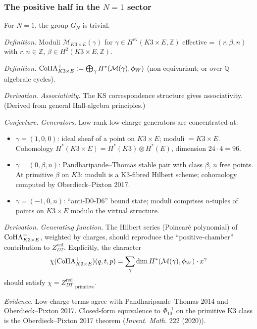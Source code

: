 \subsubsection{The positive half in the $N=1$ sector}

For $N=1$, the group $G_N$ is trivial.

\emph{Definition.} Moduli $\mathcal{M}_{K3 \times E}(\gamma)$ for $\gamma \in H^{\mathrm{ev}}(K3 \times E, \mathbb{Z})$
effective = $(r, \beta, n)$ with $r, n \in \mathbb{Z}$, $\beta \in H^2(K3 \times E, \mathbb{Z})$.

\emph{Definition.} $\mathrm{CoHA}^+_{K3 \times E} := \bigoplus_\gamma H^*(\mathcal{M}(\gamma), \phi_W)$
(non-equivariant; or over $\mathbb{Q}$-algebraic cycles).

\emph{Derivation.} \emph{Associativity.} The KS correspondence structure gives
associativity. (Derived from general Hall-algebra principles.)

\emph{Conjecture.} \emph{Generators.}
Low-rank low-charge generators are concentrated at:
\begin{itemize}
\item $\gamma = (1, 0, 0)$: ideal sheaf of a point on $K3 \times E$; moduli $= K3 \times E$.
Cohomology $H^*(K3 \times E) = H^*(K3) \otimes H^*(E)$, dimension $24 \cdot 4 = 96$.
\item $\gamma = (0, \beta, n)$: Pandharipande--Thomas stable pair with class $\beta$,
$n$ free points. At primitive $\beta$ on $K3$: moduli is a K3-fibred Hilbert scheme;
cohomology computed by Oberdieck--Pixton 2017.
\item $\gamma = (-1, 0, n)$: ``anti-D0-D6'' bound state; moduli comprises $n$-tuples of
points on $K3 \times E$ modulo the virtual structure.
\end{itemize}

\emph{Derivation.} \emph{Generating function.} The Hilbert series (Poincaré polynomial)
of $\mathrm{CoHA}^+_{K3 \times E}$, weighted by charges, should reproduce the ``positive-chamber''
contribution to $Z^{\mathrm{red}}_{DT}$. Explicitly, the character
\[
\chi(\mathrm{CoHA}^+_{K3 \times E})(q, t, p) = \sum_\gamma \dim H^*(\mathcal{M}(\gamma), \phi_W) \cdot x^\gamma
\]
should satisfy $\chi = Z^{\mathrm{red}}_{DT}|_{\mathrm{primitive}}$.

\emph{Evidence.} Low-charge terms agree with Pandharipande--Thomas 2014
and Oberdieck--Pixton 2017. Closed-form equivalence to
$\Phi_{10}^{-1}$ on the primitive K3 class is the Oberdieck--Pixton
2017 theorem (\emph{Invent. Math.} 222 (2020)).

